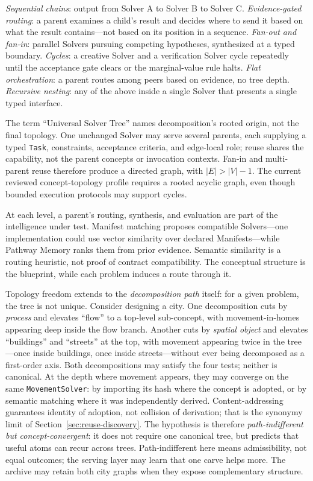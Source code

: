 \documentclass[11pt]{article}
\let\oldtexttt\texttt
\renewcommand{\texttt}[1]{\oldtexttt{\small #1}}
\begin{document}
\emph{Sequential chains}: output from Solver A to Solver B to Solver C.
\emph{Evidence-gated routing}: a parent examines a child's result and decides where to send it based on what the result contains---not based on its position in a sequence.
\emph{Fan-out and fan-in}: parallel Solvers pursuing competing hypotheses, synthesized at a typed boundary.
\emph{Cycles}: a creative Solver and a verification Solver cycle repeatedly until the acceptance gate clears or the marginal-value rule halts.
\emph{Flat orchestration}: a parent routes among peers based on evidence, no tree depth.
\emph{Recursive nesting}: any of the above inside a single Solver that presents a single typed interface.

\noindent The term ``Universal Solver Tree'' names decomposition's rooted origin, not the final topology. One unchanged Solver may serve several parents, each supplying a typed \texttt{Task}, constraints, acceptance criteria, and edge-local role; reuse shares the capability, not the parent concepts or invocation contexts. Fan-in and multi-parent reuse therefore produce a directed graph, with $|E| > |V|-1$. The current reviewed concept-topology profile requires a rooted acyclic graph, even though bounded execution protocols may support cycles.

At each level, a parent's routing, synthesis, and evaluation are part of the intelligence under test. Manifest matching proposes compatible Solvers---one implementation could use vector similarity over declared Manifests---while Pathway Memory ranks them from prior evidence. Semantic similarity is a routing heuristic, not proof of contract compatibility. The conceptual structure is the blueprint, while each problem induces a route through it.

Topology freedom extends to the \emph{decomposition path} itself: for a given problem, the tree is not unique. Consider designing a city. One decomposition cuts by \emph{process} and elevates ``flow'' to a top-level sub-concept, with movement-in-homes appearing deep inside the flow branch. Another cuts by \emph{spatial object} and elevates ``buildings'' and ``streets'' at the top, with movement appearing twice in the tree---once inside buildings, once inside streets---without ever being decomposed as a first-order axis. Both decompositions may satisfy the four tests; neither is canonical. At the depth where movement appears, they may converge on the same \texttt{MovementSolver}: by importing its hash where the concept is adopted, or by semantic matching where it was independently derived. Content-addressing guarantees identity of adoption, not collision of derivation; that is the synonymy limit of Section~\ref{sec:reuse-discovery}. The hypothesis is therefore \emph{path-indifferent but concept-convergent}: it does not require one canonical tree, but predicts that useful atoms can recur across trees. Path-indifferent here means admissibility, not equal outcomes; the serving layer may learn that one carve helps more. The archive may retain both city graphs when they expose complementary structure.
\end{document}
